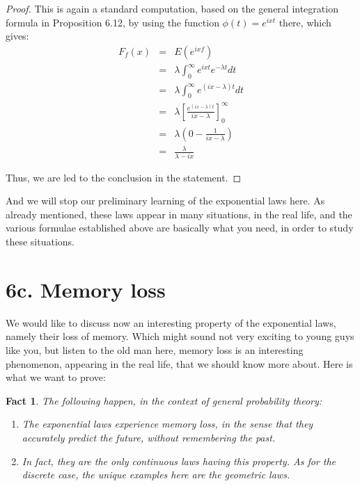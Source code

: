 \documentclass[12pt]{amsbook}
\newtheorem{fact}[theorem]{Fact}
\begin{document}
\begin{proof}
This is again a standard computation, based on the general integration formula in Proposition 6.12, by using the function $\phi(t)=e^{ixt}$ there, which gives:
\begin{eqnarray*}
F_f(x)
&=&E(e^{ixf})\\
&=&\lambda\int_0^\infty e^{ixt}e^{-\lambda t}dt\\
&=&\lambda\int_0^\infty e^{(ix-\lambda)t}dt\\
&=&\lambda\left[\frac{e^{(ix-\lambda)t}}{ix-\lambda}\right]_0^\infty\\
&=&\lambda\left(0-\frac{1}{ix-\lambda}\right)\\
&=&\frac{\lambda}{\lambda-ix}
\end{eqnarray*}

Thus, we are led to the conclusion in the statement.
\end{proof}

And we will stop our preliminary learning of the exponential laws here. As already mentioned, these laws appear in many situations, in the real life, and the various formulae established above are basically what you need, in order to study these situations.

\section*{6c. Memory loss}

We would like to discuss now an interesting property of the exponential laws, namely their loss of memory. Which might sound not very exciting to young guys like you, but listen to the old man here, memory loss is an interesting phenomenon, appearing in the real life, that we should know more about. Here is what we want to prove:

\begin{fact}
The following happen, in the context of general probability theory:
\begin{enumerate}
\item The exponential laws experience memory loss, in the sense that they accurately predict the future, without remembering the past. 

\item In fact, they are the only continuous laws having this property. As for the discrete case, the unique examples here are the geometric laws.
\end{enumerate}
\end{fact}
\end{document}
